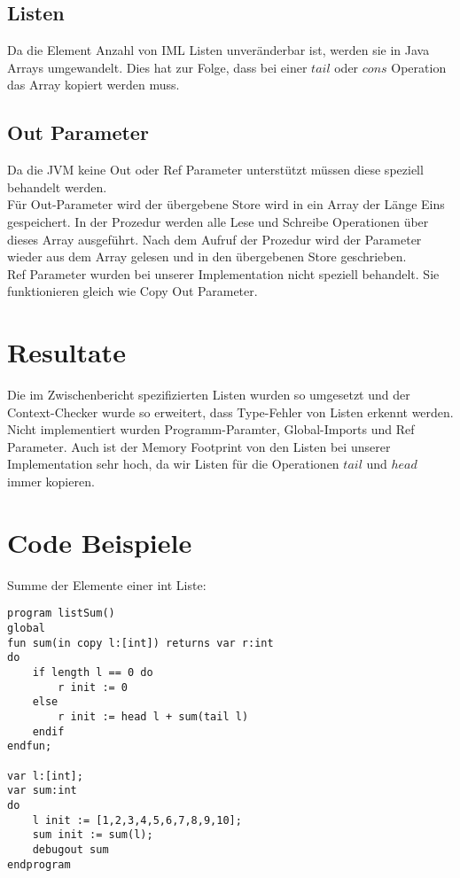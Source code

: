 \documentclass[a4paper,notitlepage,oneside]{article}
\begin{document}
\subsection{Listen}
Da die Element Anzahl von IML Listen unveränderbar ist, werden sie in Java Arrays umgewandelt.
Dies hat zur Folge, dass bei einer $tail$ oder $cons$ Operation das Array kopiert werden muss.

\subsection{Out Parameter}
Da die JVM keine Out oder Ref Parameter unterstützt müssen diese speziell behandelt werden. \\
Für Out-Parameter wird der übergebene Store wird in ein Array der Länge Eins gespeichert. In der Prozedur werden alle Lese und Schreibe Operationen über dieses Array ausgeführt. Nach dem Aufruf der Prozedur wird der Parameter wieder aus dem Array gelesen und in den übergebenen Store geschrieben. \\
Ref Parameter wurden bei unserer Implementation nicht speziell behandelt. Sie funktionieren gleich wie Copy Out Parameter.

\section{Resultate}
Die im Zwischenbericht spezifizierten Listen wurden so umgesetzt und der Context-Checker wurde so erweitert, dass Type-Fehler von Listen erkennt werden.\\ Nicht implementiert wurden Programm-Paramter, Global-Imports und Ref Parameter. Auch ist der Memory Footprint von den Listen bei unserer Implementation sehr hoch, da wir Listen für die Operationen $tail$ und $head$ immer kopieren.

\newpage
\section{Code Beispiele}
Summe der Elemente einer int Liste:
\begin{lstlisting}[language=iml, caption=Beispiel für die Berechnung der Summe der Element einer Liste in IML]
program listSum()
global
fun sum(in copy l:[int]) returns var r:int
do
	if length l == 0 do
		r init := 0
	else
		r init := head l + sum(tail l)
	endif
endfun;

var l:[int];
var sum:int
do
	l init := [1,2,3,4,5,6,7,8,9,10];
	sum init := sum(l);
	debugout sum
endprogram
\end{lstlisting}
\end{document}

